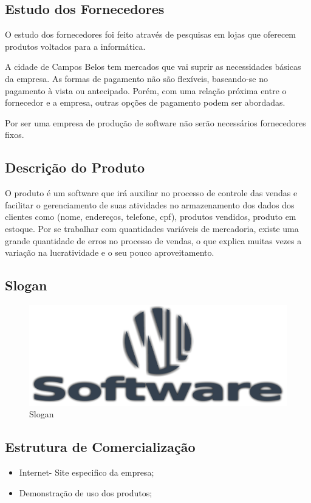 \documentclass[chapter=TITLE,12pt,oneside,a4paper,english,french,sumario=tradicional,spanish,brazil,]{abntex2}
\begin{document}
\subsection{Estudo dos Fornecedores}
O estudo dos fornecedores foi feito através de pesquisas em lojas que oferecem produtos voltados para a informática.

A cidade de Campos Belos tem mercados que vai suprir as necessidades básicas da empresa. As formas de pagamento não são flexíveis, baseando-se no pagamento à vista ou antecipado. Porém, com uma relação próxima entre o fornecedor e a empresa, outras opções de pagamento podem ser abordadas.

Por ser uma empresa de produção de software não serão necessários fornecedores fixos.

\subsection{Descrição do Produto}
O produto é um software que irá auxiliar no processo de controle das vendas e facilitar o gerenciamento de suas atividades no armazenamento dos dados dos clientes como (nome, endereços, telefone, cpf), produtos vendidos, produto em estoque. Por se trabalhar com quantidades variáveis de mercadoria, existe uma grande quantidade de erros no processo de vendas, o que explica muitas vezes a variação na lucratividade e o seu pouco aproveitamento.

\subsection{Slogan}
\begin{figure}[!htpb]\centering
	\includegraphics[scale=0.8]{logo.pdf}\caption{Slogan}
\end{figure}


\subsection{Estrutura de Comercialização}
\begin{itemize}
\item Internet- Site especifico da empresa;
\item Demonstração de uso dos produtos;
\end{itemize}
\end{document}
